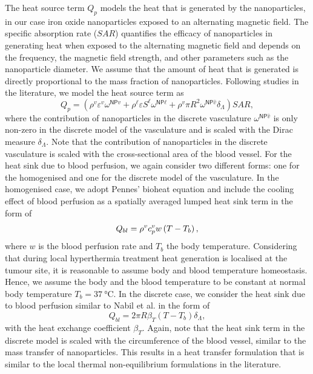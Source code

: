 \documentclass[Times1COL,AMA]{WileyNJDv5} %
\newcommand{\omegaNPl}{\omega^{\textsf{NP}\ell}}
\newcommand{\omegaNPv}{\omega^{\textsf{NP}v}}
\newcommand{\omegaNPvhat}{\omega^{\textsf{NP}\hat{v}}}
\begin{document}
The heat source term $Q_p$ models the heat that is generated by the nanoparticles, in our case iron oxide nanoparticles exposed to an alternating magnetic field.
The specific absorption rate ($SAR$) quantifies the efficacy of nanoparticles in generating heat when exposed to the alternating magnetic field and depends on the frequency, the magnetic field strength, and other parameters such as the nanoparticle diameter. \cite{Fortin2007}
We assume that the amount of heat that is generated is directly proportional to the mass fraction of nanoparticles.
Following studies in the literature, \cite{Cervadoro2013,Nabil2015} we model the heat source term as
\begin{equation}
    Q_p
    =
    \left(
    \rho^v \varepsilon^v \omegaNPv
    +
    \rho^\ell \varepsilon S^\ell \omegaNPl
    +
    \rho^v \pi R^2  \omegaNPvhat \delta_\Lambda
    \right) {SAR},
\end{equation}
where the contribution of nanoparticles in the discrete vasculature $\omegaNPvhat$ is only non-zero in the discrete model of the vasculature and is scaled with the Dirac measure $\delta_\Lambda$.
Note that the contribution of nanoparticles in the discrete vasculature is scaled with the cross-sectional area of the blood vessel.
For the heat sink due to blood perfusion, we again consider two different forms: one for the homogenised and one for the discrete model of the vasculature.
In the homogenised case, we adopt Pennes' bioheat equation \cite{Pennes1948} and include the cooling effect of blood perfusion as a spatially averaged lumped heat sink term in the form of
\begin{equation}
    Q_{bl}
    =
    \rho^v c_p^v w \left( T - T_{b} \right) \vphantom{\left( \varepsilon^v \omegaNPv + \varepsilon S^l \omegaNPl \right)},
\end{equation}
where $w$ is the blood perfusion rate and $T_{b}$ the body temperature.
Considering that during local hyperthermia treatment heat generation is localised at the tumour site, it is reasonable to assume body and blood temperature homeostasis.
Hence, we assume the body and the blood temperature to be constant at normal body temperature $T_{b} = \SI{37}{\degreeCelsius}$.
In the discrete case, we consider the heat sink due to blood perfusion similar to Nabil et al. \cite{Nabil2015,Nabil2016} in the form of
\begin{equation}
    Q_{bl}
    =
    2 \pi R \beta_T \left( T - T_{b} \right) \delta_\Lambda,
    \label{Eq:HeatSinkDiscrete}
\end{equation}
with the heat exchange coefficient $\beta_T$.
Again, note that the heat sink term in the discrete model is scaled with the circumference of the blood vessel, similar to the mass transfer of nanoparticles.
This results in a heat transfer formulation that is similar to the local thermal non-equilibrium formulations in the literature. \cite{Yuan2008,Andreozzi2019}
\end{document}
